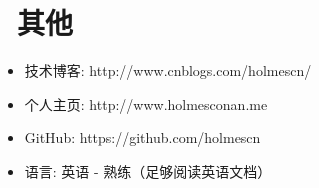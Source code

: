 \documentclass{resume}
\begin{document}
\section{\faInfo\ 其他}
\begin{itemize}[parsep=0.5ex]
  \item 技术博客: http://www.cnblogs.com/holmescn/
  \item 个人主页: http://www.holmesconan.me
  \item GitHub: https://github.com/holmescn
  \item 语言: 英语 - 熟练（足够阅读英语文档）
\end{itemize}
\end{document}
